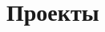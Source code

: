 \documentclass[letterpaper,10pt]{article}
\begin{document}

              
              
              
              
  
  \resumeSubHeadingListEnd



  


\section{Проекты}
  \resumeSubHeadingListStart
  
            
\end{document}
